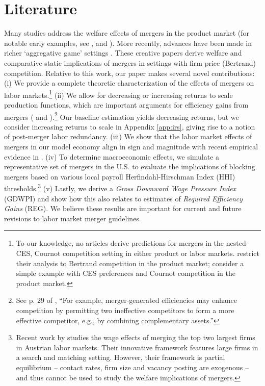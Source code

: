 \documentclass[12pt]{article}
\theoremstyle{prop}
\begin{document}
\section{Literature}\label{sec:Literature}

Many studies address the welfare effects of mergers in the product market (for notable early examples, see \citet{williamson1972economies},  \citet{farrell1990horizontal} and  \citet{werden1996robust}). 
More recently, advances have been made in richer `aggregative game' settings \citep[e.g.][]{nocke2018multiproduct,nocke2022concentration}. 
These creative papers derive welfare and comparative static implications of mergers in settings with firm price (Bertrand) competition. 
Relative to this work, our paper makes several novel contributions:
	(i) We provide a complete theoretic characterization of the effects of mergers on labor markets.\footnote{
            To our knowledge, no articles derive predictions for mergers in the nested-CES, Cournot competition setting in either product or labor markets. 
		\citet{nocke2018multiproduct} restrict their analysis to Bertrand competition in the product market; \citet{nocke2022concentration} consider a simple example with CES preferences and Cournot competition in the product market.} 
	(ii) We allow for decreasing or increasing returns to scale production functions, which are important arguments for efficiency gains from mergers (\citet{doj2010guidelines} and \citet{doj2023guidelines}).\footnote{See p. 29 of \citet{doj2010guidelines}, ``For example, merger-generated efficiencies may enhance
		competition by permitting two ineffective competitors to form a more effective competitor, e.g., by
		combining complementary assets.''} 
Our baseline estimation yields decreasing returns, but we consider increasing returns to scale in Appendix \ref{app:irs},  giving rise to a notion of post-merger labor redundancy.
(iii) We show that the labor market effects of mergers in our model economy align in sign and magnitude with recent empirical evidence in \citet{Arnold}.
	(iv) To determine macroeconomic effects, we simulate a representative set of mergers in the U.S.  to evaluate the implications of blocking mergers based on various local payroll Herfindahl-Hirschman Index (HHI)  thresholds.\footnote{
    Recent work by \citet{jarosch2024granular} studies the wage effects of merging the top two largest firms in Austrian labor markets. 
    Their innovative framework features large firms in a search and matching setting. However, their framework is partial equilibrium -- contact rates, firm size and  vacancy posting are exogenous -- and thus cannot be used to study the welfare implications of mergers.}
	(v) Lastly, we derive a \emph{Gross Downward Wage Pressure Index} (GDWPI) and show how this also relates to estimates of \emph{Required Efficiency Gains} (REG).
We believe these results are important for current and future revisions to labor market merger guidelines. 
 
\end{document}

